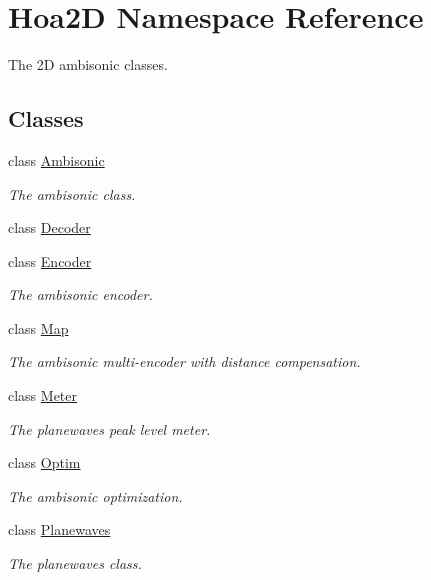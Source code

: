 \hypertarget{namespace_hoa2_d}{\section{Hoa2\-D Namespace Reference}
\label{namespace_hoa2_d}
}


The 2\-D ambisonic classes.  


\subsection*{Classes}
\begin{DoxyCompactItemize}
\item 
class \hyperlink{class_hoa2_d_1_1_ambisonic}{Ambisonic}
\begin{DoxyCompactList}\small\item\em The ambisonic class. \end{DoxyCompactList}\item 
class \hyperlink{class_hoa2_d_1_1_decoder}{Decoder}
\item 
class \hyperlink{class_hoa2_d_1_1_encoder}{Encoder}
\begin{DoxyCompactList}\small\item\em The ambisonic encoder. \end{DoxyCompactList}\item 
class \hyperlink{class_hoa2_d_1_1_map}{Map}
\begin{DoxyCompactList}\small\item\em The ambisonic multi-\/encoder with distance compensation. \end{DoxyCompactList}\item 
class \hyperlink{class_hoa2_d_1_1_meter}{Meter}
\begin{DoxyCompactList}\small\item\em The planewaves peak level meter. \end{DoxyCompactList}\item 
class \hyperlink{class_hoa2_d_1_1_optim}{Optim}
\begin{DoxyCompactList}\small\item\em The ambisonic optimization. \end{DoxyCompactList}\item 
class \hyperlink{class_hoa2_d_1_1_planewaves}{Planewaves}
\begin{DoxyCompactList}\small\item\em The planewaves class. \end{DoxyCompactList}\item 

\end{DoxyCompactItemize}
